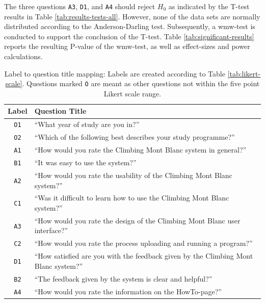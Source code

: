 The three questions \texttt{A3}, \texttt{D1}, and \texttt{A4} should reject $H_0$ as indicated by the T-test results in Table \ref{tab:results-tests-all}. However, none of the data sets are normally distributed according to the Anderson-Darling test. Subsequently, a \gls{wmw}-test is conducted to support the conclusion of the T-test. Table \ref{tab:significant-results} reports the resulting P-value of the \gls{wmw}-test, as well as effect-sizes and power calculations. \\

\begin{table}[t!]
    \centering
    \begin{tabular}{ | c | p{9cm} |}
    \hline
    \textbf{Label} & \textbf{Question Title} \\ \hline
    \texttt{O1} & ``What year of study are you in?'' \\ \hline
    \texttt{O2} & ``Which of the following best describes your study programme?''  \\ \hline
    \texttt{A1} & ``How would you rate the Climbing Mont Blanc system in general?'' \\ \hline
    \texttt{B1} & ``It was easy to use the system?'' \\ \hline
    \texttt{A2} & ``How would you rate the usability of the Climbing Mont Blanc system?'' \\ \hline
    \texttt{C1} & ``Was it difficult to learn how to use the Climbing Mont Blanc system?'' \\ \hline
    \texttt{A3} & ``How would you rate the design of the Climbing Mont Blanc user interface?'' \\ \hline
    \texttt{C2} & ``How would you rate the process uploading and running a program?'' \\ \hline
    \texttt{D1} & ``How satisfied are you with the feedback given by the Climbing Mont Blanc system?'' \\ \hline
    \texttt{B2} & ``The feedback given by the system is clear and helpful?'' \\ \hline
    \texttt{A4} & ``How would you rate the information on the HowTo-page?'' \\ \hline
    \end{tabular}
    \caption[Label to question title mapping]{Label to question title mapping: Labels are created according to Table \ref{tab:likert-scale}. Questions marked \texttt{O} are meant as other questions not within the five point Likert scale range.}
    \label{tab:label-to-title}
\end{table}

